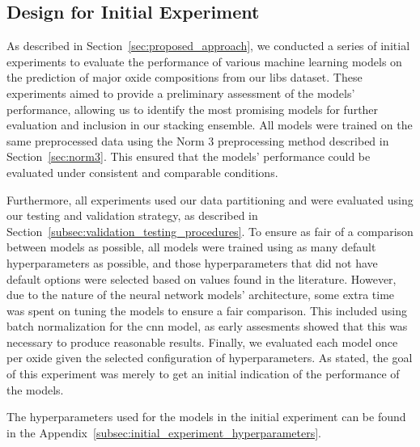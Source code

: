 \subsection{Design for Initial Experiment}\label{sec:initial-experiment}
As described in Section~\ref{sec:proposed_approach}, we conducted a series of initial experiments to evaluate the performance of various machine learning models on the prediction of major oxide compositions from our \gls{libs} dataset.
These experiments aimed to provide a preliminary assessment of the models' performance, allowing us to identify the most promising models for further evaluation and inclusion in our stacking ensemble.
All models were trained on the same preprocessed data using the Norm 3 preprocessing method described in Section~\ref{sec:norm3}.
This ensured that the models' performance could be evaluated under consistent and comparable conditions.

Furthermore, all experiments used our data partitioning and were evaluated using our testing and validation strategy, as described in Section~\ref{subsec:validation_testing_procedures}.
To ensure as fair of a comparison between models as possible, all models were trained using as many default hyperparameters as possible, and those hyperparameters that did not have default options were selected based on values found in the literature.
However, due to the nature of the neural network models' architecture, some extra time was spent on tuning the models to ensure a fair comparison.
This included using batch normalization for the \gls{cnn} model, as early assesments showed that this was necessary to produce reasonable results.
Finally, we evaluated each model once per oxide given the selected configuration of hyperparameters. 
As stated, the goal of this experiment was merely to get an initial indication of the performance of the models.

The hyperparameters used for the models in the initial experiment can be found in the Appendix~\ref{subsec:initial_experiment_hyperparameters}.